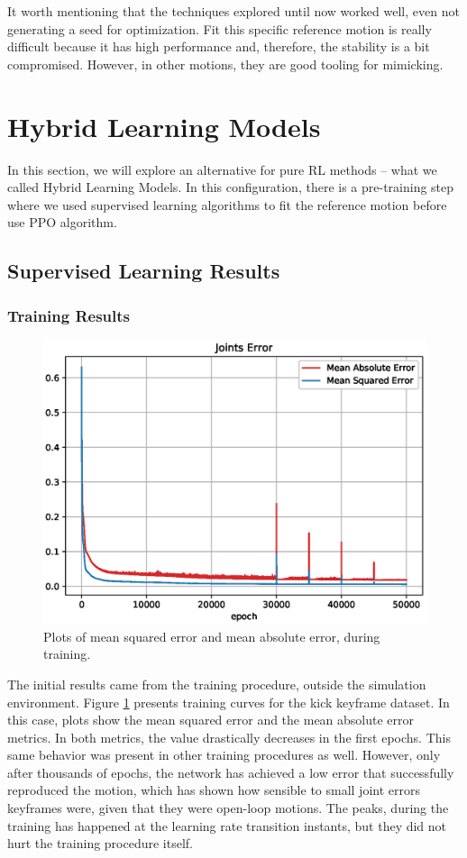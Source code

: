 It worth mentioning that the techniques explored until now worked well, even not generating a seed for optimization. Fit this specific reference motion is really difficult because it has high performance and, therefore, the stability is a bit compromised. However, in other motions, they are good tooling for mimicking.

\section{Hybrid Learning Models}
In this section, we will explore an alternative for pure RL methods -- what we called Hybrid Learning Models. In this configuration, there is a pre-training step where we used supervised learning algorithms to fit the reference motion before use PPO algorithm.

\subsection{Supervised Learning Results}
\subsubsection{Training Results}

\begin{figure}[!htbp]
	\centering
	\includegraphics[width=1\textwidth]{Cap6/errors}
	\caption{Plots of mean squared error and mean absolute error, during training.}
	\label{fig:errors}
\end{figure}

The initial results came from the training procedure, outside the simulation environment. Figure \ref{fig:errors} presents training curves for the kick keyframe dataset. In this case, plots show the mean squared error and the mean absolute error metrics. In both metrics, the value drastically decreases in the first epochs. This same behavior was present in other training procedures as well. However, only after thousands of epochs, the network has achieved a low error that successfully reproduced the motion, which has shown how sensible to small joint errors keyframes were, given that they were open-loop motions. The peaks, during the training has happened at the learning rate transition instants, but they did not hurt the training procedure itself.

